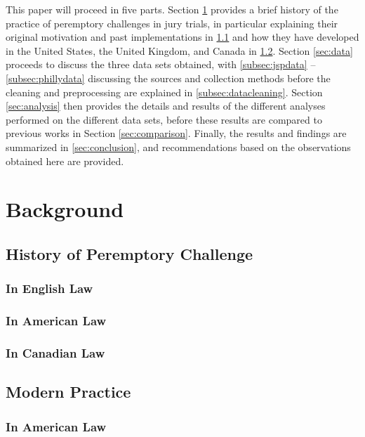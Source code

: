 \documentclass{article}
\begin{document}
This paper will proceed in five parts. Section \ref{sec:background} provides a brief history of the practice of peremptory
challenges in jury trials, in particular explaining their original motivation and past implementations in \ref{subsec:history} and
how they have developed in the United States, the United Kingdom, and Canada in \ref{subsec:modprac}. Section \ref{sec:data}
proceeds to discuss the three data sets obtained, with \ref{subsec:jspdata} -- \ref{subsec:phillydata} discussing the sources and
collection methods before the cleaning and preprocessing are explained in \ref{subsec:datacleaning}. Section \ref{sec:analysis}
then provides the details and results of the different analyses performed on the different data sets, before these results are
compared to previous works in Section \ref{sec:comparison}. Finally, the results and findings are summarized in
\ref{sec:conclusion}, and recommendations based on the observations obtained here are provided.

\section{Background} \label{sec:background}

\subsection{History of Peremptory Challenge} \label{subsec:history}

\subsubsection{In English Law}

\subsubsection{In American Law}

\subsubsection{In Canadian Law}

\subsection{Modern Practice} \label{subsec:modprac}

\subsubsection{In American Law}
\end{document}
